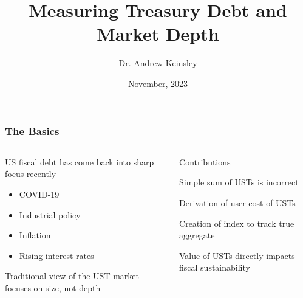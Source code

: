 \documentclass[11pt, handout, aspectratio=169]{beamer}
\title[Measuring Treasury Debt and Depth]{Measuring Treasury Debt and Market Depth}
\author[Keinsley]{Dr. Andrew Keinsley}
\institute[WSU]{Weber State University}
\date{November, 2023}
\newenvironment{wideitemize}{\itemize\addtolength{\itemsep}{10pt}}{\enditemize}
\newenvironment{wideenumerate}{\enumerate\addtolength{\itemsep}{10pt}}{\endenumerate}
\begin{document}
\frame{\maketitle}


\begin{frame}
\frametitle{The Basics}
\begin{columns}[t]
	\begin{column}{0.49\textwidth}
		\begin{wideitemize}
			\item US fiscal debt has come back into sharp focus recently
			\begin{itemize}
				\item COVID-19
				\item Industrial policy
				\item Inflation
				\item Rising interest rates
			\end{itemize}
			\item Traditional view of the UST market focuses on size, not depth 
		\end{wideitemize}	
	\end{column}
	\hfill
	\begin{column}{0.49\textwidth}
		\begin{wideitemize}
			\item Contributions
			\begin{wideenumerate}
				\item Simple sum of USTs is incorrect
				\item Derivation of user cost of USTs
				\item Creation of index to track true aggregate
				\item Value of USTs directly impacts fiscal sustainability
			\end{wideenumerate}
		\end{wideitemize}
	\end{column}
\end{columns}
\end{frame}

\end{document}
